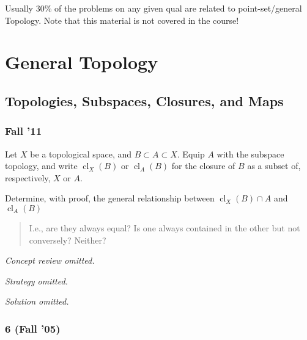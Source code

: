 \begin{warnings}

Usually 30\% of the problems on any given qual are related to
point-set/general Topology. Note that this material is not covered in
the course!

\end{warnings}

\hypertarget{general-topology}{%
\section{General Topology}\label{general-topology}}

\hypertarget{topologies-subspaces-closures-and-maps}{%
\subsection{Topologies, Subspaces, Closures, and
Maps}\label{topologies-subspaces-closures-and-maps}}

\hypertarget{fall-11}{%
\subsubsection{Fall '11}\label{fall-11}}

\begin{problem}[Fall 2011]

Let \(X\) be a topological space, and \(B \subset A \subset X\). Equip
\(A\) with the subspace topology, and write
\({ \operatorname{cl}} _X (B)\) or \({ \operatorname{cl}} _A (B)\) for
the closure of \(B\) as a subset of, respectively, \(X\) or \(A\).

Determine, with proof, the general relationship between
\({ \operatorname{cl}} _X (B) \cap A\) and
\({ \operatorname{cl}} _A (B)\)

\begin{quote}
I.e., are they always equal? Is one always contained in the other but
not conversely? Neither?
\end{quote}

\end{problem}

\emph{Concept review omitted.}

\emph{Strategy omitted.}

\emph{Solution omitted.}

\hypertarget{fall-05}{%
\subsubsection{6 (Fall '05)}\label{fall-05}}

